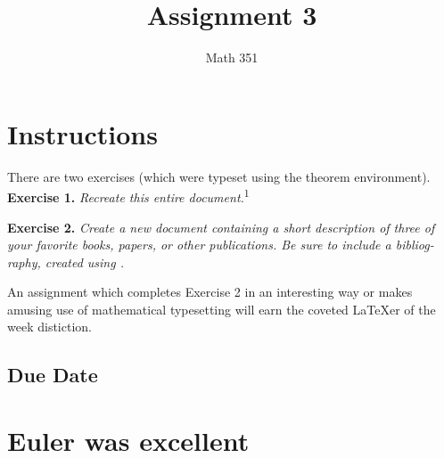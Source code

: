 \documentclass{article}
\title{Assignment 3}
\author{Math 351}
\date{}
\begin{document}
\maketitle

\tableofcontents %
\section{Instructions}
There are two exercises (which were typeset using the theorem environment).
\noindent\textbf{Exercise 1.} \emph{Recreate this entire document.}\textsuperscript{1}

\noindent\textbf{Exercise 2.} \emph{Create a new document containing a short description
of three of your favorite books, papers, or other publications. Be sure to include
a bibliog-raphy, created using .}

An assignment which completes Exercise 2 in an interesting way or makes amusing
use of mathematical typesetting will earn the coveted \LaTeX er of the week distiction.

\subsection{Due Date}
\section{Euler was excellent}
\end{document}
